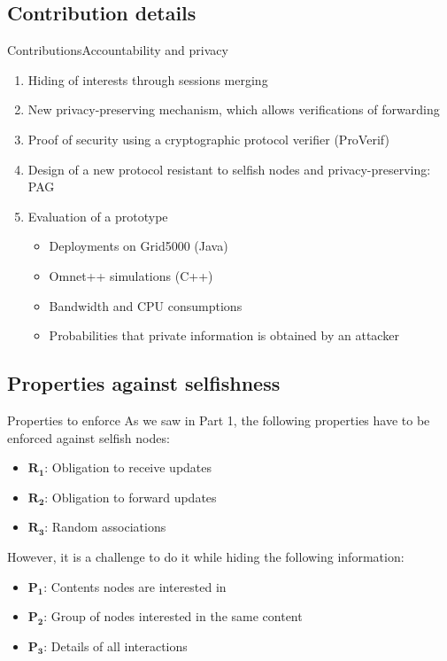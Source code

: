 \documentclass[10pt]{beamer}
\begin{document}
\subsection{Contribution details}
\begin{frame}{Contributions}{Accountability and privacy}
      \begin{enumerate}
        \item Hiding of interests through sessions merging
        \item New privacy-preserving mechanism, which allows verifications of forwarding
        \item Proof of security using a cryptographic protocol verifier (ProVerif)
        \item Design of a new protocol resistant to selfish nodes and privacy-preserving: PAG
        \item Evaluation of a prototype
        \begin{itemize}
          \item Deployments on Grid5000 (Java)
          \item Omnet++ simulations (C++)
          \item Bandwidth and CPU consumptions
          \item Probabilities that private information is obtained by an attacker
          \end{itemize}
      \end{enumerate}
\end{frame}

\subsection{Properties against selfishness}
\begin{frame}{Properties to enforce}{}
   As we saw in Part 1, the following properties have to be enforced against selfish nodes:
     \begin{itemize}
        \item $\mathbf{R_1}$: Obligation to receive updates
        \item $\mathbf{R_2}$: Obligation to forward updates
        \item $\mathbf{R_3}$: Random associations
     \end{itemize}
   \vspace{5mm}
   However, it is a challenge to do it while hiding the following information:
   \begin{itemize}
        \item $\mathbf{P_1}$: Contents nodes are interested in
        \item $\mathbf{P_2}$: Group of nodes interested in the same content
        \item $\mathbf{P_3}$: Details of all interactions
   \end{itemize}
   
\end{frame}
\end{document}
